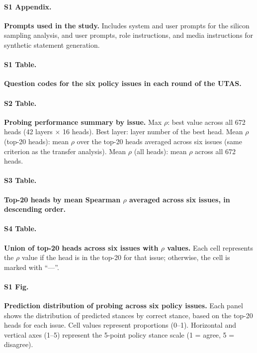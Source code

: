 \documentclass[10pt,letterpaper]{article}
\begin{document}
\paragraph*{S1 Appendix.}
\label{S1_Appendix}
{\bf Prompts used in the study.} Includes system and user prompts for the silicon sampling analysis, and user prompts, role instructions, and media instructions for synthetic statement generation.

\paragraph*{S1 Table.}
\label{S1_Table}
{\bf Question codes for the six policy issues in each round of the UTAS.}

\paragraph*{S2 Table.}
\label{S2_Table}
{\bf Probing performance summary by issue.} Max $\rho$: best value across all 672 heads (42 layers $\times$ 16 heads). Best layer: layer number of the best head. Mean $\rho$ (top-20 heads): mean $\rho$ over the top-20 heads averaged across six issues (same criterion as the transfer analysis). Mean $\rho$ (all heads): mean $\rho$ across all 672 heads.

\paragraph*{S3 Table.}
\label{S3_Table}
{\bf Top-20 heads by mean Spearman $\rho$ averaged across six issues, in descending order.}

\paragraph*{S4 Table.}
\label{S4_Table}
{\bf Union of top-20 heads across six issues with $\rho$ values.} Each cell represents the $\rho$ value if the head is in the top-20 for that issue; otherwise, the cell is marked with ``---''.

\paragraph*{S1 Fig.}
\label{S1_Fig}
{\bf Prediction distribution of probing across six policy issues.} Each panel shows the distribution of predicted stances by correct stance, based on the top-20 heads for each issue. Cell values represent proportions (0--1). Horizontal and vertical axes (1--5) represent the 5-point policy stance scale (1 = agree, 5 = disagree).
\end{document}
